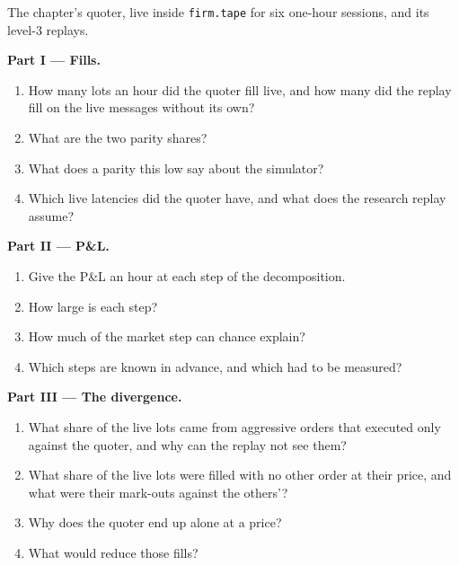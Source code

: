 \begin{problem}\label{pb:rs:simulation-versus-live:1}
The chapter's quoter, live inside \texttt{firm.tape} for six one-hour sessions, and its level-3 replays.

\medskip\noindent\textbf{Part I --- Fills.}
\begin{enumerate}
\item How many lots an hour did the quoter fill live, and how many did the replay fill on the live messages without its own?
\item What are the two parity shares?
\item What does a parity this low say about the simulator?
\item Which live latencies did the quoter have, and what does the research replay assume?
\end{enumerate}

\medskip\noindent\textbf{Part II --- P\&L.}
\begin{enumerate}[resume]
\item Give the P\&L an hour at each step of the decomposition.
\item How large is each step?
\item How much of the market step can chance explain?
\item Which steps are known in advance, and which had to be measured?
\end{enumerate}

\medskip\noindent\textbf{Part III --- The divergence.}
\begin{enumerate}[resume]
\item What share of the live lots came from aggressive orders that executed only against the quoter, and why can the replay not see them?
\item What share of the live lots were filled with no other order at their price, and what were their mark-outs against the others'?
\item Why does the quoter end up alone at a price?
\item What would reduce those fills?
\end{enumerate}


\end{problem}
